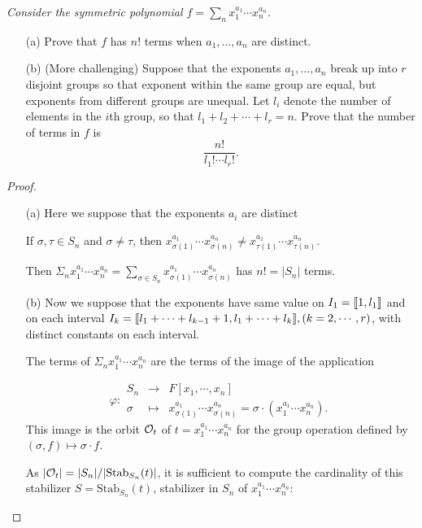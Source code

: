 \documentclass[11pt,a4paper]{article}
\def\gcro{\mbox{[\hspace{-.15em}[}}%
\def\dcro{\mbox{]\hspace{-.15em}]}}
\begin{document}
{\it Consider the symmetric polynomial $f = \sum_n x_1^{a_1}\cdots x_n^{a_n}$.
\begin{enumerate}
\item[(a)] Prove that $f$ has $n!$ terms when $a_1,\ldots,a_n$ are distinct.
\item[(b)] (More challenging) Suppose that the exponents $a_1,\ldots, a_n$ break up into $r$ disjoint groups so that exponent within the same group are equal, but exponents from different groups are unequal. Let $l_i$ denote the number of elements in the $i$th group, so that $l_1+l_2+\cdots+l_r  = n$. Prove that the number of terms in $f$ is
$$\frac{n!}{l_1!\cdots l_r!}.$$
\end{enumerate}
}

\begin{proof}
\begin{enumerate}
\item[(a)]
Here we suppose that the exponents $a_i$ are distinct

If  $\sigma,\tau \in S_n$ and $\sigma \neq \tau$, then $x_{\sigma(1)}^{a_1}\cdots x_{\sigma(n)}^{a_n} \neq x_{\tau(1)}^{a_1}\cdots x_{\tau(n)}^{a_n}$.

Then $\Sigma_n x_{1}^{a_1}\cdots x_{n}^{a_n} = \sum\limits_{\sigma \in S_n} x_{\sigma(1)}^{a_1}\cdots x_{\sigma(n)}^{a_n}$ has $n! = |S_n|$ terms.


\item[(b)]
Now we suppose that the exponents have same value on $I_1 = \gcro1,l_1\dcro$ and on each interval  $I_k  = \gcro l_1+\cdots+l_{k-1}+1, l_1+\cdots+l_k\dcro , (k=2,\cdots,r)$, with distinct constants on each interval.

The terms of $\Sigma_n x_{1}^{a_1}\cdots x_{n}^{a_n}$ are the terms of the image of the application

$$\varphi : 
\begin{array}{ccc}
S_n & \to  &F[x_1,\cdots,x_n]   \\
\sigma  &  \mapsto  &   x_{\sigma(1)}^{a_1}\cdots x_{\sigma(n)}^{a_n} = \sigma \cdot(x_{1}^{a_1}\cdots x_{n}^{a_n}).
\end{array}
$$
This image is the orbit ${\cal O}_t $ of $t=x_{1}^{a_1}\cdots x_{n}^{a_n}$ for the group operation defined by $(\sigma,f) \mapsto\sigma \cdot f$.

As $\vert {\cal O}_t \vert = \vert S_n \vert /  \vert \mathrm{Stab}_{S_n}(t) \vert$, it is sufficient to compute the cardinality of this stabilizer $S = \mathrm{Stab}_{S_n}(t)$, stabilizer in $S_n$ of $x_{1}^{a_1}\cdots x_{n}^{a_n}$: 


\end{enumerate}
\end{proof}
\end{document}
